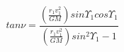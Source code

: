 \begin{equation*}
tan \nu = \frac{\left(\frac{r_{1}v_{1}^2}{GM}\right)sin\Upsilon_{1}cos\Upsilon_{1}}{\left(\frac{r_{1}v_{1}^{2}}{GM}\right)sin^2\Upsilon_{1} - 1} \tag{4.28}
\end{equation*}

